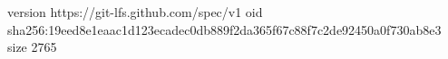 version https://git-lfs.github.com/spec/v1
oid sha256:19eed8e1eaac1d123ecadec0db889f2da365f67c88f7c2de92450a0f730ab8e3
size 2765
